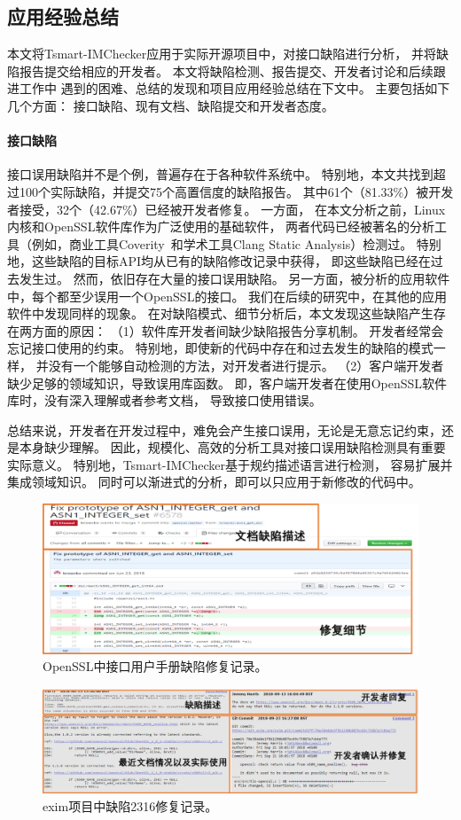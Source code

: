 \subsection{应用经验总结}
本文将Tsmart-IMChecker应用于实际开源项目中，对接口缺陷进行分析，
并将缺陷报告提交给相应的开发者。
本文将缺陷检测、报告提交、开发者讨论和后续跟进工作中
遇到的困难、总结的发现和项目应用经验总结在下文中。
主要包括如下几个方面：
接口缺陷、现有文档、缺陷提交和开发者态度。

\paragraph{接口缺陷}
接口误用缺陷并不是个例，普遍存在于各种软件系统中。
特别地，本文共找到超过100个实际缺陷，并提交75个高置信度的缺陷报告。
其中61个（81.33\%）被开发者接受，32个（42.67\%）已经被开发者修复。
一方面，
在本文分析之前，Linux内核和OpenSSL软件库作为广泛使用的基础软件，
两者代码已经被著名的分析工具（例如，商业工具Coverity~\cite{coverity}和学术工具Clang Static Analysis）检测过。
特别地，这些缺陷的目标API均从已有的缺陷修改记录中获得，
即这些缺陷已经在过去发生过。
然而，依旧存在大量的接口误用缺陷。
另一方面，被分析的应用软件中，每个都至少误用一个OpenSSL的接口。
我们在后续的研究中，在其他的应用软件中发现同样的现象。
在对缺陷模式、细节分析后，本文发现这些缺陷产生存在两方面的原因：
（1）软件库开发者间缺少缺陷报告分享机制。
开发者经常会忘记接口使用的约束。
特别地，即使新的代码中存在和过去发生的缺陷的模式一样，
并没有一个能够自动检测的方法，对开发者进行提示。
（2）客户端开发者缺少足够的领域知识，导致误用库函数。
即，客户端开发者在使用OpenSSL软件库时，没有深入理解或者参考文档，
导致接口使用错误。

总结来说，开发者在开发过程中，难免会产生接口误用，无论是无意忘记约束，还是本身缺少理解。
因此，规模化、高效的分析工具对接口误用缺陷检测具有重要实际意义。
特别地，Tsmart-IMChecker基于规约描述语言进行检测，
容易扩展并集成领域知识。
同时可以渐进式的分析，即可以只应用于新修改的代码中。
\begin{figure}[t]
	\centering
	\includegraphics[width=0.8\linewidth]{figures/cp4-doc-bug.png}
	\caption{
		OpenSSL中接口用户手册缺陷修复记录。
	}
	\label{fig:4-4-doc-bug}
\end{figure}
\begin{figure}[b]
	\centering
	\includegraphics[width=\linewidth]{figures/cp4-exim-bug.png}
	\caption{
		exim项目中缺陷2316修复记录。
	}
	\label{fig:4-4-exim-bug}
\end{figure}
